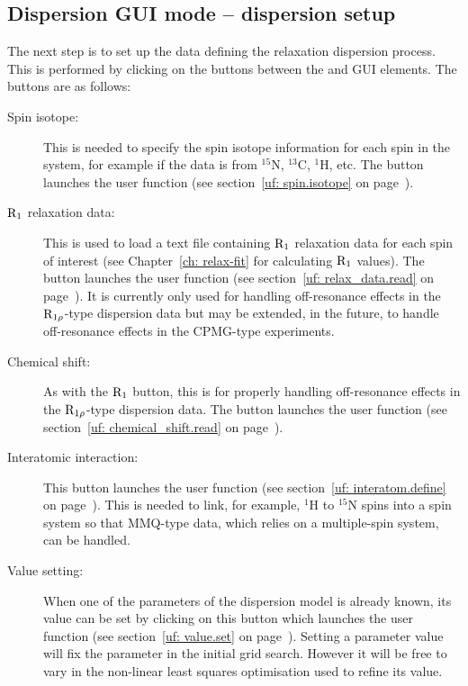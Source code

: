 
\subsection{Dispersion GUI mode -- dispersion setup}

The next step is to set up the data defining the relaxation dispersion process.
This is performed by clicking on the buttons between the  and  GUI elements.
The buttons are as follows:
\begin{description}
  \item[Spin isotope:]  This is needed to specify the spin isotope information for each spin in the system, for example if the data is from $^{15}$N, $^{13}$C, $^1$H, etc.
    The button launches the  user function (see section~\ref{uf: spin.isotope} on page~\pageref{uf: spin.isotope}).
  \item[$\mathrm{R}_1$ relaxation data:]  This is used to load a text file containing $\mathrm{R}_1$ relaxation data for each spin of interest (see Chapter~\ref{ch: relax-fit} for calculating $\mathrm{R}_1$ values).
    The button launches the  user function (see section~\ref{uf: relax_data.read} on page~\pageref{uf: relax_data.read}).
    It is currently only used for handling off-resonance effects in the $\mathrm{R}_{1\rho}$-type dispersion data but may be extended, in the future, to handle off-resonance effects in the CPMG-type experiments.
  \item[Chemical shift:]  As with the $\mathrm{R}_1$ button, this is for properly handling off-resonance effects in the $\mathrm{R}_{1\rho}$-type dispersion data.
    The button launches the  user function (see section~\ref{uf: chemical_shift.read} on page~\pageref{uf: chemical_shift.read}).
  \item[Interatomic interaction:]  This button launches the  user function (see section~\ref{uf: interatom.define} on page~\pageref{uf: interatom.define}).
    This is needed to link, for example, $^1$H to $^{15}$N spins into a spin system so that MMQ-type data, which relies on a multiple-spin system, can be handled.
  \item[Value setting:]  When one of the parameters of the dispersion model is already known, its value can be set by clicking on this button which launches the  user function (see section~\ref{uf: value.set} on page~\pageref{uf: value.set}).
    Setting a parameter value will fix the parameter in the initial grid search.
    However it will be free to vary in the non-linear least squares optimisation used to refine its value.
\end{description}

